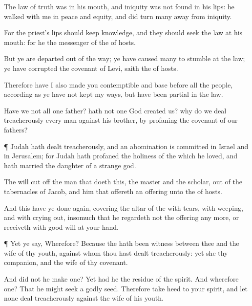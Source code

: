{The
law of
truth was in his
mouth, and
iniquity was not
found in his
lips: he
walked with me in
peace and
equity, and did
turn
many
away from
iniquity.

For the
priest’s
lips should
keep
knowledge, and they should
seek the
law at his
mouth: for he
{} the
messenger of the
{} of
hosts.

But ye are
departed out of the
way; ye have caused
many to
stumble at the
law; ye have
corrupted the
covenant of
Levi,
saith the
{} of
hosts.

Therefore have I also
made you
contemptible and
base before all the
people,
according as ye have not
kept my
ways, but have been
partial in the
law.


\par }{\PP {}Have we not all
one
father? hath not
one
God
created us? why do we deal
treacherously every
man against his
brother, by
profaning the
covenant of our
fathers?


\par }{\PP {}¶
Judah hath dealt
treacherously, and an
abomination is
committed in
Israel and in
Jerusalem; for
Judah hath
profaned the
holiness of the
{} which he
loved, and hath
married the
daughter of a
strange
god.

The
{} will cut
off the
man that
doeth this, the
master and the
scholar, out of the
tabernacles of
Jacob, and him that
offereth an
offering unto the
{} of
hosts.

And this have ye
done
again,
covering the
altar of the
{} with
tears, with
weeping, and with crying
out, insomuch that he
regardeth not the
offering any more, or
receiveth
{} with good
will at your
hand.


\par }{\PP {}¶ Yet ye
say,
Wherefore? Because the
{} hath been
witness between thee and the
wife of thy
youth, against whom thou hast dealt
treacherously: yet
{} she thy
companion, and the
wife of thy
covenant.

And did not he
make
one? Yet had he the
residue of the
spirit. And wherefore
one? That he might
seek a
godly
seed. Therefore take
heed to your
spirit, and let none deal
treacherously against the
wife of his
youth.

}
